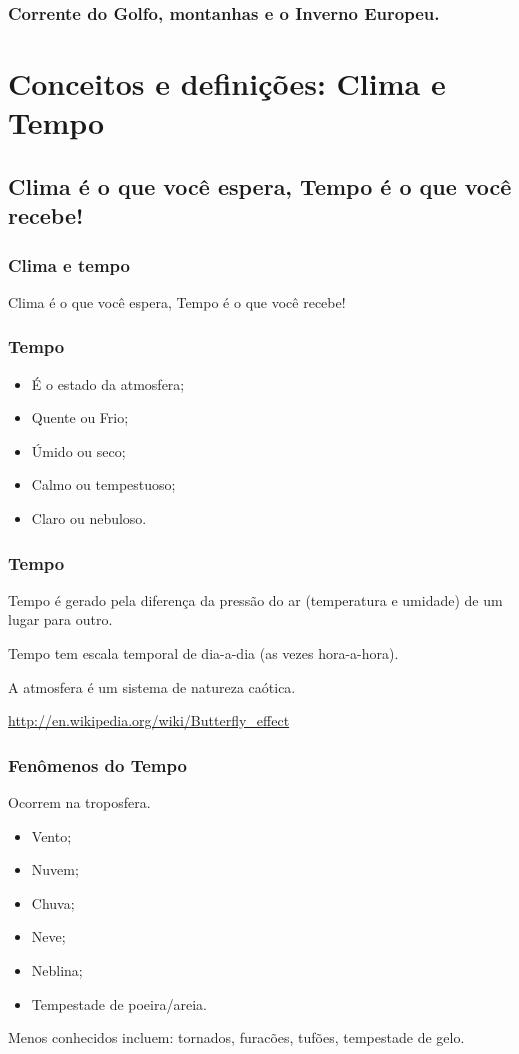\begin{frame}
\frametitle{Corrente do Golfo, montanhas e o Inverno Europeu.}
\end{frame}

\section{Conceitos e definições: Clima e Tempo}
\subsection{Clima é o que você espera, Tempo é o que você recebe!}

\begin{frame}
\frametitle{Clima e tempo}
  \begin{block}{}
    Clima é o que você espera, Tempo é o que você recebe!
  \end{block}
\end{frame}

\begin{frame}
\frametitle{Tempo}
  \begin{itemize}[<+-| alert@+>]
    \item É o estado da atmosfera;
    \item Quente ou Frio;
    \item Úmido ou seco;
    \item Calmo ou tempestuoso;
    \item Claro ou nebuloso.
  \end{itemize}
\end{frame}

\begin{frame}
\frametitle{Tempo}
  \begin{block}{}
    Tempo é gerado pela diferença da pressão do ar (temperatura e umidade) de
    um lugar para outro.
  \end{block}
\pause
  \begin{block}{}
    Tempo tem escala temporal de dia-a-dia (as vezes hora-a-hora).
  \end{block}
\pause
  \begin{block}{}
     A atmosfera é um sistema de natureza caótica.
  \end{block}
\hfill \url{http://en.wikipedia.org/wiki/Butterfly_effect}
\end{frame}

\begin{frame}
\frametitle{Fenômenos do Tempo}
Ocorrem na troposfera.
  \begin{itemize}[<+-| alert@+>]
    \item Vento;
    \item Nuvem;
    \item Chuva;
    \item Neve;
    \item Neblina;
    \item Tempestade de poeira/areia.
  \end{itemize}
\pause
{\scriptsize Menos conhecidos incluem: tornados, furacões, tufões,
tempestade de gelo.}
\end{frame}

